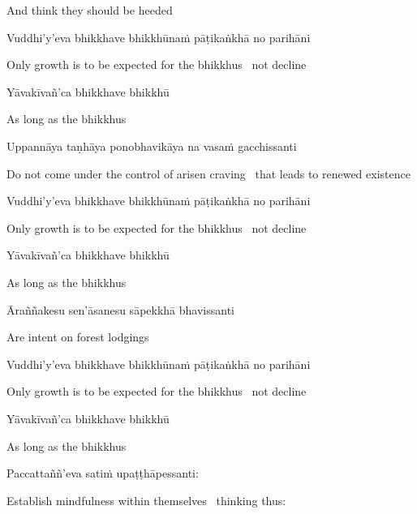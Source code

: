 \begin{english}
  And think they should be heeded
\end{english}

Vuddhi'y'eva bhikkhave bhikkhūnaṁ pāṭikaṅkhā no parihāni

\begin{english}
  Only growth is to be expected for the bhikkhus \breathmark\ not decline
\end{english}

Yāvakīvañ'ca bhikkhave bhikkhū

\begin{english}
  As long as the bhikkhus
\end{english}

Uppannāya taṇhāya ponobhavikāya na vasaṁ gacchissanti

\begin{english-hang}
  Do not come under the control of arisen craving \breathmark\ that leads to renewed existence
\end{english-hang}

Vuddhi'y'eva bhikkhave bhikkhūnaṁ pāṭikaṅkhā no parihāni

\begin{english}
  Only growth is to be expected for the bhikkhus \breathmark\ not decline
\end{english}

Yāvakīvañ'ca bhikkhave bhikkhū

\begin{english}
  As long as the bhikkhus
\end{english}

Āraññakesu sen'āsanesu sāpekkhā bhavissanti

\begin{english}
  Are intent on forest lodgings
\end{english}

Vuddhi'y'eva bhikkhave bhikkhūnaṁ pāṭikaṅkhā no parihāni

\begin{english}
  Only growth is to be expected for the bhikkhus \breathmark\ not decline
\end{english}

Yāvakīvañ'ca bhikkhave bhikkhū

\begin{english}
  As long as the bhikkhus
\end{english}

Paccattaññ'eva satiṁ upaṭṭhāpessanti:

\begin{english}
  Establish mindfulness within themselves \breathmark\ thinking thus:
\end{english}

